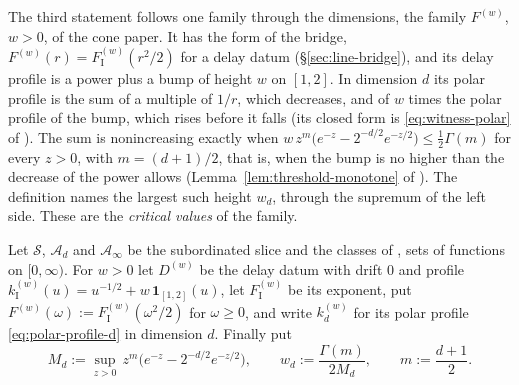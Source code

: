 The third statement follows one family through the dimensions, the family $F^{(w)}$, $w > 0$,
of the cone paper. It has the form of the bridge,
$F^{(w)}(r) = F^{(w)}_{\mathrm I}(r^2/2)$ for a delay datum (\S\ref{sec:line-bridge}), and its
delay profile is a power plus a bump of height $w$ on $[1,2]$. In dimension $d$ its polar profile
is the sum of a multiple of $1/r$, which decreases, and of $w$ times the polar profile of the
bump, which rises before it falls (its closed form is \ref{eq:witness-polar} of \suppl). The sum
is nonincreasing exactly when
$w\,z^m\bigl(e^{-z} - 2^{-d/2}e^{-z/2}\bigr) \le \tfrac12\Gamma(m)$ for every $z > 0$, with
$m = (d+1)/2$, that is, when the bump is no higher than the decrease of the power allows
(Lemma~\ref{lem:threshold-monotone} of \suppl). The definition names the largest such height
$w_d$, through
the supremum of the left side. These are the \emph{critical values} of the family.

\begin{definition}\label{def:filtration-thresholds}
Let $\mathcal{S}$, $\mathcal{A}_d$ and $\mathcal{A}_\infty$ be the subordinated slice and the
classes of , sets of functions on $[0,\infty)$. For $w > 0$ let
$D^{(w)}$ be the delay datum  with drift $0$ and profile
$k^{(w)}_{\mathrm I}(u) = u^{-1/2} + w\,\mathbf{1}_{[1,2]}(u)$, let $F^{(w)}_{\mathrm I}$ be its
exponent, put $F^{(w)}(\omega) := F^{(w)}_{\mathrm I}(\omega^2/2)$ for $\omega \ge 0$, and write
$k^{(w)}_d$ for its polar profile \ref{eq:polar-profile-d} in dimension $d$. Finally put
\begin{equation}\label{eq:threshold-constant}
  M_d := \sup_{z>0}\, z^m\bigl(e^{-z} - 2^{-d/2}e^{-z/2}\bigr),
  \qquad w_d := \frac{\Gamma(m)}{2M_d}, \qquad m := \frac{d+1}{2} .
\end{equation}
\end{definition}

